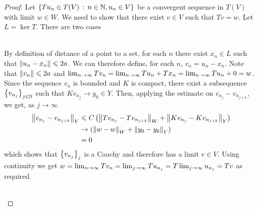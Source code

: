 \documentclass[12pt]{article}
\begin{document}
\begin{proof}
    Let $\set{Tu_n \in T(V) \wh n \in \N, u_n \in V}$ be a convergent sequence in $T(V)$ with limit $w \in W$. We need to show that there exist $v \in V$ such that $T v = w$. Let $L = \ker T$. There are two cases 
    
    \begin{case} \hfill \\
        By definition of distance of a point to a set, for each $n$ there exist $x_n \in L$ such that $\norm[u_n - x_n] \leq 2a$. We can therefore define, for each $n$, $v_n = u_n - x_n$. Note that $\norm[v_n] \leq 2a$ and $\Lim Tv_n = \Lim T u_n + Tx_n = \Lim Tu_n + 0 = w$. Since the sequence $v_n$ is bounded and $K$ is compact, there exist a subsequence $\set{v_{n_j}}_{j \in \N}$ such that $Kv_{n_j} \to y_0 \in Y$. Then, applying the estimate on $v_{n_j} - v_{n_{j + k}}$, we get, as $j \to \infty$
        \begin{align*}
        \norm[v_{n_j} - v_{n_{j + k}}]_V 
        & \leq C \brac{\norm[Tv_{n_j} - Tv_{n_{j + k}}]_W + \norm[Kv_{n_j} - Kv_{n_{j + k}}]_Y} \\
        & \to  \brac{\norm[w - w]_W + \norm[y_0 - y_0]_Y} \\
        & = 0 
        \end{align*}
        which shows that $\set{v_{n_j}}_j$ is a Cauchy and therefore has a limit $v \in V$. Using continuity we get $w = \Lim Tv_{n} = \Lim[j] Tu_{n_j} = T \Lim[j] u_{n_j} = Tv$ as required. 
    \end{case} \hfill \\
    

\end{proof}
\end{document}
